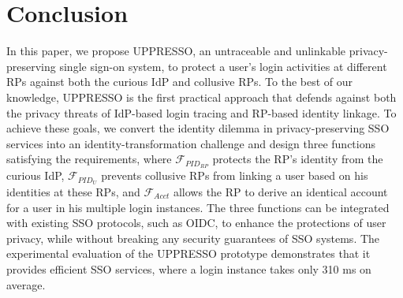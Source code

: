 \section{Conclusion}
\label{sec:conclusion}
In this paper, we propose UPPRESSO, an untraceable and unlinkable privacy-preserving single sign-on system,
 to protect a user's login activities at different RPs against both the curious IdP and collusive RPs.
To the best of our knowledge,
 UPPRESSO is the first practical approach
    that defends against both the privacy threats of IdP-based login tracing and RP-based identity linkage.
To achieve these goals, we convert the identity dilemma in privacy-preserving SSO services into an identity-transformation challenge
 and design three functions satisfying the requirements,
 where $\mathcal{F}_{PID_{RP}}$ protects the RP's identity from the curious IdP,
 $\mathcal{F}_{PID_{U}}$ prevents collusive RPs from linking a user based on his identities at these RPs,
 and $\mathcal{F}_{Acct}$ allows the RP to derive an identical account for a user in his multiple login instances.
The three functions can be integrated with existing SSO protocols,
    such as OIDC,
    to enhance the protections of user privacy,
    while without breaking any security guarantees of  SSO systems.
The experimental evaluation of the UPPRESSO prototype demonstrates
 that it provides efficient SSO services, where a login instance takes only 310 ms on average.

